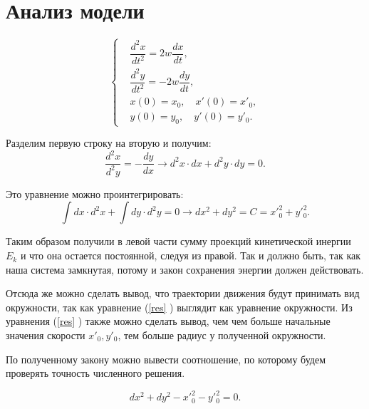 \pagebreak

\section{Анализ модели}
	\begin{equation*}
		\begin{cases}
			& \dfrac{d^2 x}{dt^2} = 2w \dfrac{dx}{dt}, \\
			&\dfrac{d^2 y}{dt^2} = -2w \dfrac{dy}{dt}, \\
			& x(0) = x_0, \quad x'(0) = x'_0, \\
			& y(0) = y_0, \quad y'(0) = y'_0.
		\end{cases}
	\end{equation*}

	Разделим первую строку на вторую и получим:
	\begin{equation}
		\dfrac{d^2 x}{d^2y} =  -\dfrac{dy}{dx} \rightarrow d^2x \cdot dx + d^2 y \cdot dy = 0.
	\end{equation}

	Это уравнение можно проинтегрировать:
	\begin{equation} \label{res}
		\int dx \cdot d^2x + \int d y \cdot d^2 y = 0 \rightarrow dx^2 + dy^2 = C = x'^2_0 + y'^2_0.
	\end{equation}

	Таким образом получили в левой части сумму проекций кинетической инергии \( E_k \) и что она остается постоянной, следуя из правой. Так и должно быть, так как наша система замкнутая, потому и закон сохранения энергии должен действовать.

	Отсюда же можно сделать вывод, что траектории движения будут принимать вид окружности, так как уравнение (\ref{res} ) выглядит как уравнение окружности. Из уравнения (\ref{res} ) также можно сделать вывод, чем чем больше начальные значения скорости \( x'_0, y'_0 \), тем больше радиус у полученной окружности.

	По полученному закону можно вывести соотношение, по которому будем проверять точность численного решения.

	\begin{equation}
		dx^2 + dy^2 - x'_0^2 - y'_0^2 = 0.
	\end{equation}


\pagebreak